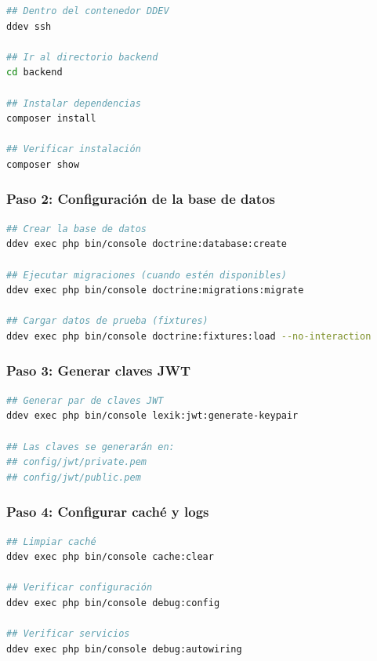 \documentclass[12pt,a4paper,oneside]{report}
\begin{document}
\begin{lstlisting}[language=bash]
## Dentro del contenedor DDEV
ddev ssh

## Ir al directorio backend
cd backend

## Instalar dependencias
composer install

## Verificar instalación
composer show
\end{lstlisting}

\subsubsection{Paso 2: Configuración de la base de
datos}\label{paso-2-configuraciuxf3n-de-la-base-de-datos}

\begin{lstlisting}[language=bash]
## Crear la base de datos
ddev exec php bin/console doctrine:database:create

## Ejecutar migraciones (cuando estén disponibles)
ddev exec php bin/console doctrine:migrations:migrate

## Cargar datos de prueba (fixtures)
ddev exec php bin/console doctrine:fixtures:load --no-interaction
\end{lstlisting}

\subsubsection{Paso 3: Generar claves
JWT}\label{paso-3-generar-claves-jwt}

\begin{lstlisting}[language=bash]
## Generar par de claves JWT
ddev exec php bin/console lexik:jwt:generate-keypair

## Las claves se generarán en:
## config/jwt/private.pem
## config/jwt/public.pem
\end{lstlisting}

\subsubsection{Paso 4: Configurar caché y
logs}\label{paso-4-configurar-cachuxe9-y-logs}

\begin{lstlisting}[language=bash]
## Limpiar caché
ddev exec php bin/console cache:clear

## Verificar configuración
ddev exec php bin/console debug:config

## Verificar servicios
ddev exec php bin/console debug:autowiring
\end{lstlisting}
\end{document}
